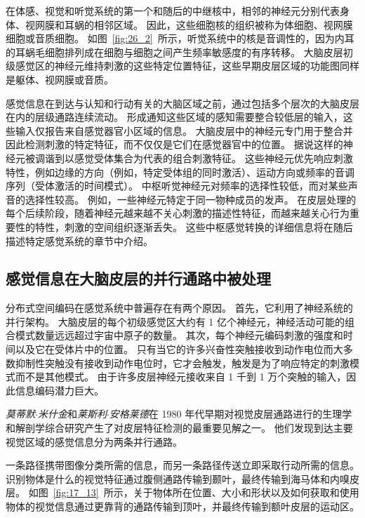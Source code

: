 在体感、视觉和听觉系统的第一个和随后的中继核中，相邻的神经元分别代表身体、视网膜和耳蜗的相邻区域。 
因此，这些细胞核的组织被称为体细胞、视网膜细胞或音质细胞。 
如图~\ref{fig:26_2}~所示，听觉系统中的核是音调性的，因为内耳的耳蜗毛细胞排列成在细胞与细胞之间产生频率敏感度的有序转移。
大脑皮层初级感觉区的神经元维持刺激的这些特定位置特征，这些早期皮层区域的功能图同样是躯体、视网膜或音质。


感觉信息在到达与认知和行动有关的大脑区域之前，通过包括多个层次的大脑皮层在内的层级通路连续流动。
形成通知这些区域的感知需要整合较低层的输入，这些输入仅报告来自感觉器官小区域的信息。
大脑皮层中的神经元专门用于整合并因此检测刺激的特定特征，而不仅仅是它们在感觉器官中的位置。
据说这样的神经元被调谐到以感觉受体集合为代表的组合刺激特征。
这些神经元优先响应刺激特性，例如边缘的方向（例如，特定受体组的同时激活）、运动方向或频率的音调序列（受体激活的时间模式）。
中枢听觉神经元对频率的选择性较低，而对某些声音的选择性较高。
例如，一些神经元特定于同一物种成员的发声。
在皮层处理的每个后续阶段，随着神经元越来越不关心刺激的描述性特征，而越来越关心行为重要性的特性，刺激的空间组织逐渐丢失。
这些中枢感觉转换的详细信息将在随后描述特定感觉系统的章节中介绍。



\subsection{感觉信息在大脑皮层的并行通路中被处理}

分布式空间编码在感觉系统中普遍存在有两个原因。
首先，它利用了神经系统的并行架构。
大脑皮层的每个初级感觉区大约有 1 亿个神经元，神经活动可能的组合模式数量远远超过宇宙中原子的数量。
其次，每个神经元编码刺激的强度和时间以及它在受体片中的位置。
只有当它的许多兴奋性突触接收到动作电位而大多数抑制性突触没有接收到动作电位时，它才会触发，触发是为了响应特定的刺激模式而不是其他模式。
由于许多皮层神经元接收来自 1 千到 1 万个突触的输入，因此信息编码潜力巨大。


\textit{莫蒂默$\cdot$米什金}和\textit{莱斯利$\cdot$安格莱德}在 1980 年代早期对视觉皮层通路进行的生理学和解剖学综合研究产生了对皮层特征检测的最重要见解之一。
他们发现到达主要视觉区域的感觉信息分为两条并行通路。


一条路径携带图像分类所需的信息，而另一条路径传送立即采取行动所需的信息。
识别物体是什么的视觉特征通过腹侧通路传输到颞叶，最终传输到海马体和内嗅皮层。 
如图~\ref{fig:17_13}~所示，关于物体所在位置、大小和形状以及如何获取和使用物体的视觉信息通过更靠背的通路传输到顶叶，并最终传输到额叶皮层的运动区。


